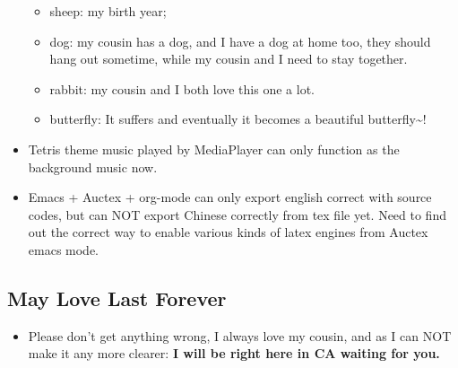 \documentclass[9pt,b5paper]{article}
\begin{document}
\begin{itemize}
\begin{itemize}
\item sheep: my birth year;
\item dog: my cousin has a dog, and I have a dog at home too, they should hang out sometime, while my cousin and I need to stay together.
\item rabbit: my cousin and I both love this one a lot.
\item butterfly: It suffers and eventually it becomes a beautiful butterfly\textasciitilde{}!
\end{itemize}
\item Tetris theme music played by MediaPlayer can only function as the background music now.
\item Emacs + Auctex + org-mode can only export english correct with source codes, but can NOT export Chinese correctly from tex file yet. Need to find out the correct way to enable various kinds of latex engines from Auctex emacs mode.
\end{itemize}
\subsection{May Love Last Forever}
\label{sec-1-1}
\begin{itemize}
\item Please don't get anything wrong, I always love my cousin, and as I can NOT make it any more clearer: \textbf{I will be right here in CA waiting for you.}
\end{itemize}
\end{document}
